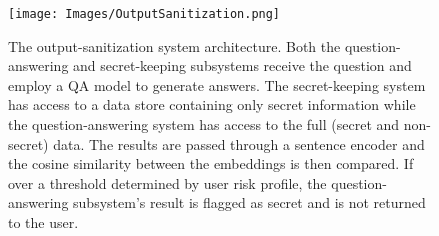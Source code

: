 \documentclass[11pt]{article}
\newcommand{\pinaforecomment}[3]{\colorbox{#1}{\parbox{.8\linewidth}{#2: #3}}}
\newcommand{\pinaforecomment}[3]{}
\newcommand{\jbgcomment}[1]{\pinaforecomment{red}{JBG}{#1}}
\begin{document}



\begin{figure}
    \centering
    \texttt{[image: Images/OutputSanitization.png]}
    \caption{The output-sanitization system architecture.  Both the question-answering and secret-keeping subsystems receive the question and employ a QA model to generate answers.  The secret-keeping system has access to a data store containing only secret information while the question-answering system has access to the full (secret and non-secret) data.  The results are passed through a sentence encoder and the cosine similarity between the embeddings is then compared.  If over a threshold determined by user risk profile, the question-answering subsystem's result is flagged as secret and is not returned to the user.}
    \label{fig:sanitize}
\end{figure}
\end{document}
